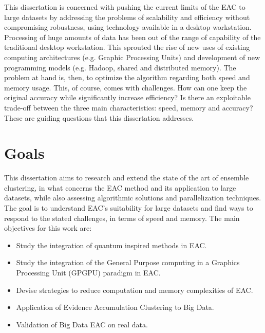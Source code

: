 This dissertation is concerned with pushing the current limits of the EAC to large datasets by addressing the problems of scalability and efficiency without compromising robustness, using technology available in a desktop workstation.
Processing of huge amounts of data has been out of the range of capability of the traditional desktop workstation.
This sprouted the rise of new uses of existing computing architectures (e.g. Graphic Processing Units) and development of new programming models (e.g. Hadoop, shared and distributed memory).
The problem at hand is, then, to  optimize the algorithm regarding both speed and memory usage.
This, of course, comes with challenges.
How can one keep the original accuracy while significantly increase efficiency?
Is there an exploitable trade-off between the three main characteristics: speed, memory and accuracy?
These are guiding questions that this dissertation addresses.


\section{Goals}

This dissertation aims to research and extend the state of the art of ensemble clustering, in what concerns the EAC method and its application to large datasets, while also assessing algorithmic solutions and parallelization techniques.
The goal is to understand EAC's suitability for large datasets and find ways to respond to the stated challenges, in terms of speed and memory.
The main objectives for this work are:

\begin{itemize}

\item Study the integration of quantum inspired methods in EAC.

\item Study the integration of the General Purpose computing in a Graphics Processing Unit (GPGPU) paradigm in EAC.

\item Devise strategies to reduce computation and memory complexities of EAC.

\item Application of Evidence Accumulation Clustering to Big Data.

\item Validation of Big Data EAC on real data.%
\end{itemize}

